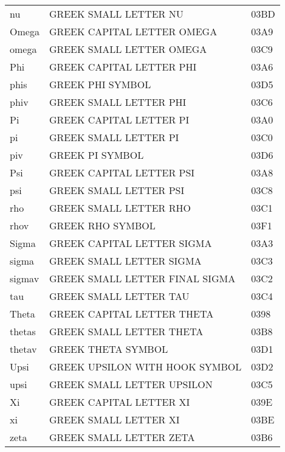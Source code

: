 \documentclass{article}
\begin{document}
\begin{supertabular}{lll}
nu                 & GREEK SMALL LETTER NU               & 03BD\\
Omega              & GREEK CAPITAL LETTER OMEGA          & 03A9\\
omega              & GREEK SMALL LETTER OMEGA            & 03C9\\
Phi                & GREEK CAPITAL LETTER PHI            & 03A6\\
phis               & GREEK PHI SYMBOL                    & 03D5\\
phiv               & GREEK SMALL LETTER PHI              & 03C6\\
Pi                 & GREEK CAPITAL LETTER PI             & 03A0\\
pi                 & GREEK SMALL LETTER PI               & 03C0\\
piv                & GREEK PI SYMBOL                     & 03D6\\
Psi                & GREEK CAPITAL LETTER PSI            & 03A8\\
psi                & GREEK SMALL LETTER PSI              & 03C8\\
rho                & GREEK SMALL LETTER RHO              & 03C1\\
rhov               & GREEK RHO SYMBOL                    & 03F1\\
Sigma              & GREEK CAPITAL LETTER SIGMA          & 03A3\\
sigma              & GREEK SMALL LETTER SIGMA            & 03C3\\
sigmav             & GREEK SMALL LETTER FINAL SIGMA      & 03C2\\
tau                & GREEK SMALL LETTER TAU              & 03C4\\
Theta              & GREEK CAPITAL LETTER THETA          & 0398\\
thetas             & GREEK SMALL LETTER THETA            & 03B8\\
thetav             & GREEK THETA SYMBOL                  & 03D1\\
Upsi               & GREEK UPSILON WITH HOOK SYMBOL      & 03D2\\
upsi               & GREEK SMALL LETTER UPSILON          & 03C5\\
Xi                 & GREEK CAPITAL LETTER XI             & 039E\\
xi                 & GREEK SMALL LETTER XI               & 03BE\\
zeta               & GREEK SMALL LETTER ZETA             & 03B6\\
\end{supertabular}
\end{document}
